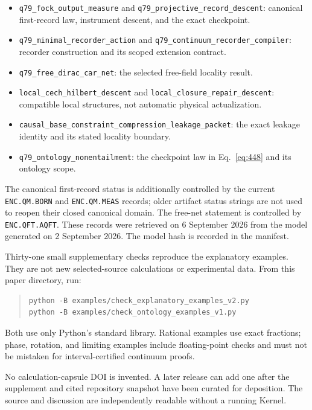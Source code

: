 \documentclass[11pt,a4paper]{article}
\begin{document}
\begin{itemize}
\item \texttt{q79\_fock\_output\_measure} and \texttt{q79\_projective\_record\_descent}: canonical first-record law, instrument descent, and the exact checkpoint.
\item \texttt{q79\_minimal\_recorder\_action} and \texttt{q79\_continuum\_recorder\_compiler}: recorder construction and its scoped extension contract.
\item \texttt{q79\_free\_dirac\_car\_net}: the selected free-field locality result.
\item \texttt{local\_cech\_hilbert\_descent} and \texttt{local\_closure\_repair\_descent}: compatible local structures, not automatic physical actualization.
\item \texttt{causal\_base\_constraint\_compression\_leakage\_packet}: the exact leakage identity and its stated locality boundary.
\item \texttt{q79\_ontology\_nonentailment}: the checkpoint law in Eq.~\eqref{eq:448} and its ontology scope.
\end{itemize}

The canonical first-record status is additionally controlled by the current
\texttt{ENC.QM.BORN} and \texttt{ENC.QM.MEAS} records; older artifact status
strings are not used to reopen their closed canonical domain.
The free-net statement is controlled by \texttt{ENC.QFT.AQFT}.
These records were retrieved on 6 September 2026 from the model generated on
2 September 2026. The model hash is recorded in the manifest.

Thirty-one small supplementary checks reproduce the explanatory examples.
They are not new selected-source calculations or experimental data. From
this paper directory, run:
\begin{quote}
\small
\begin{verbatim}
python -B examples/check_explanatory_examples_v2.py
python -B examples/check_ontology_examples_v1.py
\end{verbatim}
\end{quote}
Both use only Python's standard library.
Rational examples use exact fractions; phase, rotation, and limiting examples
include floating-point checks and must not be mistaken for interval-certified
continuum proofs.

No calculation-capsule DOI is invented. A later release can add one after the
supplement and cited repository snapshot have been curated for deposition.
The source and discussion are independently readable without a running Kernel.
\endgroup
\end{document}
